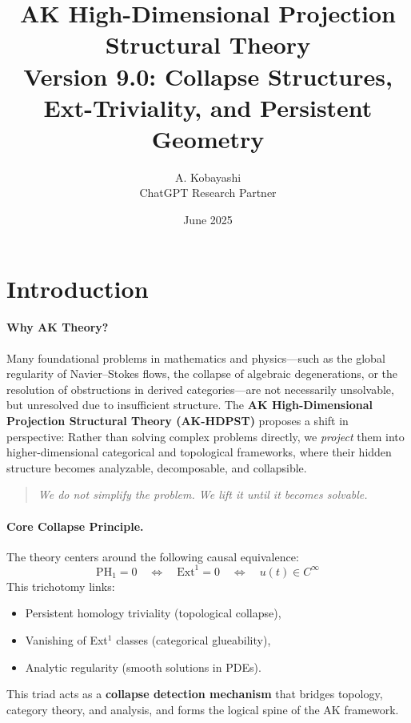 \documentclass[11pt]{article}
\title{AK High-Dimensional Projection Structural Theory\\
\Large Version 9.0: Collapse Structures, Ext-Triviality, and Persistent Geometry}
\author{A. Kobayashi \\ \small ChatGPT Research Partner}
\date{June 2025}
\begin{document}
\maketitle

\tableofcontents
\newpage

\section{Introduction}

\paragraph{Why AK Theory?}
Many foundational problems in mathematics and physics—such as the global regularity of Navier–Stokes flows, the collapse of algebraic degenerations, or the resolution of obstructions in derived categories—are not necessarily unsolvable, but unresolved due to insufficient structure.  
The \textbf{AK High-Dimensional Projection Structural Theory (AK-HDPST)} proposes a shift in perspective:  
Rather than solving complex problems directly, we \emph{project} them into higher-dimensional categorical and topological frameworks, where their hidden structure becomes analyzable, decomposable, and collapsible.

\begin{quote}
\emph{We do not simplify the problem. We lift it until it becomes solvable.}
\end{quote}

\paragraph{Core Collapse Principle.}
The theory centers around the following causal equivalence:
\[
\mathrm{PH}_1 = 0 \quad \Leftrightarrow \quad \mathrm{Ext}^1 = 0 \quad \Leftrightarrow \quad u(t) \in C^\infty
\]
This trichotomy links:
\begin{itemize}
  \item Persistent homology triviality (topological collapse),
  \item Vanishing of Ext$^1$ classes (categorical glueability),
  \item Analytic regularity (smooth solutions in PDEs).
\end{itemize}
This triad acts as a \textbf{collapse detection mechanism} that bridges topology, category theory, and analysis, and forms the logical spine of the AK framework.
\end{document}
